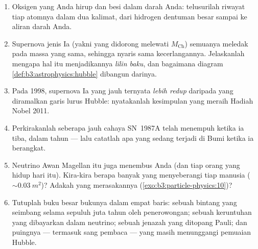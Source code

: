 \begin{problem}
\begin{enumerate}[resume]
  \item Oksigen yang Anda hirup dan besi dalam darah Anda:
        telusurilah riwayat tiap atomnya dalam dua kalimat, dari
        hidrogen dentuman besar sampai ke aliran darah Anda.
  \item Supernova jenis Ia (yakni  yang didorong melewati
        $M_{\text{Ch}}$) semuanya meledak pada massa yang sama, sehingga
        nyaris sama kecerlangannya. Jelaskanlah mengapa hal itu menjadikannya
        \emph{lilin baku}, dan bagaimana diagram
        \cref{def:b3:astrophysics:hubble} dibangun
        darinya.
  \item Pada 1998, supernova Ia yang jauh ternyata \emph{lebih redup}
        daripada yang diramalkan garis lurus Hubble: nyatakanlah
        kesimpulan yang meraih Hadiah Nobel 2011.
  \item Perkirakanlah seberapa jauh cahaya SN~1987A telah menempuh ketika ia
        tiba, dalam tahun --- lalu catatlah apa yang sedang terjadi di
        Bumi ketika ia berangkat.
  \item Neutrino Awan Magellan itu juga menembus Anda (dan tiap orang
        yang hidup hari itu). Kira-kira berapa banyak yang menyeberangi tiap manusia
        (${\sim}\qty{0.03}{m^2}$)? Adakah yang merasakannya
        (\cref{exo:b3:particle-physics:10})?
  \item Tutuplah buku besar bukunya dalam empat baris: sebuah bintang yang seimbang
        selama sepuluh juta tahun oleh penerowongan; sebuah keruntuhan yang dibayarkan
        dalam neutrino; sebuah jenazah yang ditopang Pauli; dan
        puingnya --- termasuk sang pembaca --- yang masih menunggangi
        pemuaian Hubble.
\end{enumerate}
\end{problem}
